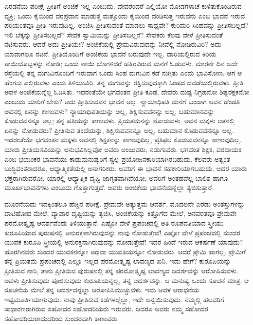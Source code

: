 ಎರಡನೆಯ ಪರೀಕ್ಷೆ ಪ್ರೀತಿಗೆ ಅಂಜಿಕೆ ಇಲ್ಲ ಎಂಬುದು. ದೇವರೆಂದರೆ ಎಲ್ಲಿಯೋ ಮೋಡಗಳಾಚೆ ಕುಳಿತುಕೊಂಡಿರುವ ವ್ಯಕ್ತಿ; ಒಂದು ಕೈಯಿಂದ ವರಪ್ರದಾನ ಮಾಡುತ್ತ ಮತ್ತೊಂದು ಕೈಯಿಂದ ದಂಡಿಸುತ್ತ ಇರುವನು ಎಂಬ ಭಾವನೆ ಇರುವ ಪರಿಯಂತವೂ ಪ್ರೀತಿ ಇರುವುದಿಲ್ಲ. ಅಂಜಿಸಿ ಪ್ರೀತಿಸುವಂತೆ ಮಾಡಲು ಸಾಧ್ಯವೇ? ಕುರಿಮರಿ ಸಿಂಹವನ್ನು ಪ್ರೀತಿಸಬಲ್ಲದೆ? ಇಲಿ ಬೆಕ್ಕನ್ನು ಪ್ರೀತಿಸಬಲ್ಲದೆ? ಸೇವಕ ಸ್ವಾಮಿಯನ್ನು ಪ್ರೀತಿಸಬಲ್ಲನೆ? ಸೇವಕರು ಕೆಲವು ವೇಳೆ ಪ್ರೀತಿಸುವಂತೆ ನಟಿಸುವರು. ಆದರೆ ಅದು ಪ್ರೀತಿಯೇ? ಅಂಜಿಕೆ\-ಯಲ್ಲಿ ಪ್ರೇಮವಿರುವುದನ್ನು ನೀವೆಲ್ಲಿ ನೋಡಿರುವಿರಿ? ಅದು ಯಾವಾಗಲೂ ನಟನೆ. ಪ್ರೀತಿಯೊಂದಿಗೆ ಅಂಜಿಕೆಯ ಭಾವನೆ ಬರುವುದೇ ಇಲ್ಲ. ದಾರಿಯಲ್ಲಿರುವ ಕಿರಿಯ ತಾಯಿಯೊಬ್ಬಳನ್ನು ನೋಡಿ; ಒಂದು ನಾಯಿ ಬೊಗಳಿದರೆ ಹತ್ತಿರವಿರುವ ಮನೆಗೆ ಓಡುವಳು. ಮಾರನೇ ದಿನ ಅದೇ ರಸ್ತೆಯಲ್ಲಿ ತನ್ನ ಮಗುವಿನೊಂದಿಗೆ ಇರುವಾಗ ಒಂದು ಸಿಂಹ ಮಗುವಿನ ಕಡೆ ನುಗ್ಗಿತು ಎಂದು ಭಾವಿಸೋಣ. ಆಗ ಆ ಹೆಂಗಸು ಎಲ್ಲಿರುವಳು ಎಂದು ತಿಳಿಯುವಿರಿ. ತನ್ನ ಮಗುವನ್ನು ರಕ್ಷಿಸುವುದಕ್ಕಾಗಿ ಸಿಂಹದ ದವಡೆಯಲ್ಲಿರುವಳು. ಪ್ರೀತಿ ಅವಳ ಅಂಜಿಕೆಯನ್ನೆಲ್ಲ ಓಡಿಸಿತು. ಇದರಂತೆಯೇ ಭಗವಂತನ ಪ್ರೀತಿ ಕೂಡ. ದೇವರು ದುಷ್ಟ ನಿಗ್ರಹನೋ ಶಿಷ್ಟರಕ್ಷಕನೋ ಎಂಬುದು ಯಾರಿಗೆ ಬೇಕು? ಅದು ಪ್ರೀತಿಸುವವನ ಭಾವನೆ ಅಲ್ಲ. ನ್ಯಾಯಾಧಿಪತಿ ಮನೆಗೆ ಬಂದಾಗ ಅವನ ಹೆಂಡತಿ ಅವನಲ್ಲಿ ಏನನ್ನು ಕಾಣುವಳು? ನ್ಯಾಯಾಧಿಪತಿಯನ್ನು ಅಲ್ಲ, ಶಿಕ್ಷಿಸುವವನನ್ನು ಅಲ್ಲ, ಬಹುಮಾನವನ್ನು ಕೊಡುವವನನ್ನೂ ಅಲ್ಲ; ತನ್ನ ಪತಿಯನ್ನು ಕಾಣುವಳು, ಪ್ರಿಯತಮನನ್ನು ನೋಡುವಳು. ಅವನ ಮಕ್ಕಳು ಆತನಲ್ಲಿ ಏನನ್ನು ನೋಡುವರು? ಪ್ರೀತಿಸುವ ತಂದೆಯನ್ನು, ಶಿಕ್ಷಿಸುವವನನ್ನೂ ಅಲ್ಲ, ಬಹುಮಾನ ಕೊಡುವವನನ್ನೂ ಅಲ್ಲ. ಇದರಂತೆಯೇ ಭಗವಂತನ ಮಕ್ಕಳು ಅವನಲ್ಲಿ ಶಿಕ್ಷಕನನ್ನು ಕಾಣುವುದಿಲ್ಲ, ಪ್ರತಿಫಲ ಕೊಡುವವನನ್ನೂ ಕಾಣುವುದಿಲ್ಲ. ಯಾರು ಪ್ರೀತಿಯ\break ಸವಿಯನ್ನು ಅನುಭವಿಸಿಲ್ಲವೋ ಅವರು ಅಂಜುವರು, ನಡುಗುವರು. ಭಗವಂತ ಶಿಕ್ಷಕ, ವರದಾಯಕ ಎಂಬ ಭಯಂಕರ ಭಾವನೆಯು ಕಾಡುಮನುಷ್ಯರಿಗೆ ಸ್ವಲ್ಪ ಪ್ರಯೋಜನಕಾರಿಯಾಗಿರಬಹುದು. ಕೆಲವರು ಅತ್ಯಂತ ಬುದ್ಧಿವಂತರಾದರೂ, ಆಧ್ಯಾತ್ಮಿಕತೆಯಲ್ಲಿ ಅನಾಗ\-ರಿಕರು. ಅವರಿಗೆ ಈ ಭಾವನೆ ಸಹಕಾರಿಯಾಗಬಹುದು. ಆದರೆ ಯಾರು ಭಕ್ತರಾಗಿರುವರೋ, ಯಾರಲ್ಲಿ ಆಧ್ಯಾತ್ಮಿಕ ದೃಷ್ಟಿ ಜಾಗೃತವಾಗಿದೆಯೋ, ಅವರಿಗೆ ಅಂತಹವೆಲ್ಲ ಬಾಲಿಶ ಹಾಗೂ ಮೂರ್ಖಭಾವನೆಗಳು ಎಂಬುದು ಗೊತ್ತಾಗುತ್ತದೆ. ಅವರು ಅಂಜಿಕೆಯ ಭಾವನೆಯನ್ನೆಲ್ಲಾ ತ್ಯಜಿಸುತ್ತಾರೆ.

ಮೂರನೆಯದು ಇದಕ್ಕಿಂತಲೂ ಹೆಚ್ಚಿನ ಪರೀಕ್ಷೆ. ಪ್ರೇಮವೇ ಅತ್ಯುತ್ತಮ ಆದರ್ಶ. ಮೊದಲನೇ ಎರಡು ಅಂತಸ್ತುಗಳನ್ನು ದಾಟಿಹೋದ ಮೇಲೆ, ವ್ಯಾಪಾರ ದೃಷ್ಟಿಯನ್ನು ತ್ಯಜಿಸಿ, ಅಂಜಿಕೆಯನ್ನು ಕಿತ್ತೊಗೆದ ಮೇಲೆ, ಅನವರತವೂ ಪ್ರೇಮವೇ ಪರಮೋತ್ಕೃಷ್ಟ ಆದರ್ಶವೆಂದು ತಿಳಿಯುತ್ತಾನೆ. ಎಷ್ಟೋ ವೇಳೆ ಪ್ರಪಂಚದಲ್ಲಿ ಅತಿ ರೂಪವತಿಯಾದ ಸ್ತ್ರೀಯು ಕುರೂಪಿಯಾದ ಪುರುಷನಲ್ಲಿ ಅನುರಕ್ತಳಾಗಿರುವುದನ್ನು ನಾವು ನೋಡುತ್ತೇವೆ! ಎಷ್ಟೋ ವೇಳೆ ಪ್ರಪಂಚದಲ್ಲಿ ಸುಂದರ ಯುವಕ ಕುರೂಪಿ ಸ್ತ್ರೀಯಲ್ಲಿ ಅನುರಕ್ತನಾಗಿರುವುದನ್ನು ನೋಡುತ್ತೇವೆ! ಇದರ ಹಿಂದೆ ಇರುವ ಆಕರ್ಷಣೆ ಯಾವುದು? ಹೊರಗಿನವರು ಸುಂದರ ಯುವಕನನ್ನೋ ಅಥವಾ ಯುವತಿಯನ್ನೋ ನೋಡುವರು. ಆದರೆ ಪ್ರೇಮಿ ಹಾಗಲ್ಲ. ಪ್ರೇಮಿಗೆ ತನ್ನ ಪ್ರಿಯತಮೆ ಪ್ರಪಂಚದಲ್ಲಿ ಎಲ್ಲೂ ಇಲ್ಲದ ಪರಮೋತ್ಕೃಷ್ಟ ಲಾವಣ್ಯದ ಖನಿ. ಇದು ಹೇಗೆ? ಕುರೂಪಿಯನ್ನು ಪ್ರೀತಿಸುವ ನಾರಿ, ತಾನು ಪ್ರೀತಿಸುವ ಪುರುಷನಲ್ಲಿ ತನ್ನ ಪರಮೋತ್ಕೃಷ್ಟ ಲಾವಣ್ಯದ ಆದರ್ಶವನ್ನು ಆರೋಪಿಸುವಳು. ಅವಳು ಪ್ರೀತಿಸುವುದು ಪೂಜಿಸುವುದು ಕುರೂಪಿಯನ್ನಲ್ಲ, ತನ್ನ ಆದರ್ಶವನ್ನು. ಆ ಮನುಷ್ಯ ಒಂದು ಸೂಚನೆ ಮಾತ್ರ. ಆ ಸೂಚನೆಯ ಮೇಲೆ ತನ್ನ ಆದರ್ಶವನ್ನೆಲ್ಲಾ ಆರೋಪಿಸಿ\break ಮುಚ್ಚುವಳು. ಇದು ಅವಳ ಆರಾಧನೆಯ ಇಷ್ಟಮೂರ್ತಿಯಾಗುವುದು. ನಾವು ಪ್ರೀತಿಸುವ ಕಡೆಗಳಲ್ಲೆಲ್ಲಾ, ಇದೇ ಅನ್ವಯಿಸುವುದು. ನಮ್ಮಲ್ಲಿ ಹಲವರಿಗೆ ಸಾಧಾರಣರಾಗಿರುವ ಸಹೋದರ ಸಹೋದರಿಯರು ಇರುವರು. ಆದರೂ ಅವರು ನಮ್ಮ ಸಹೋದರ ಸಹೋದರಿಯ\-ರಾದುದರಿಂದ ಸುಂದರವಾಗಿ ಕಾಣುವರು.

